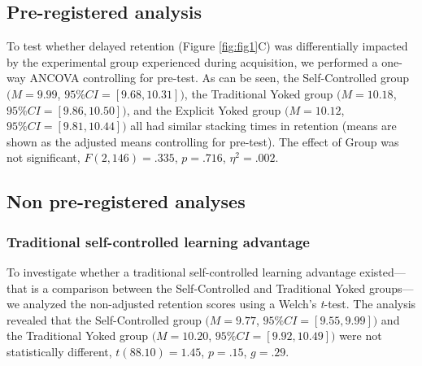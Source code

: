 \documentclass[
  english,
  doc, donotrepeattitle,floatsintext]{apa7}
\begin{document}
\hypertarget{pre-registered-analysis}{%
\subsection{Pre-registered analysis}\label{pre-registered-analysis}}

To test whether delayed retention (Figure \ref{fig:fig1}C) was differentially impacted by the experimental group experienced during acquisition, we performed a one-way ANCOVA controlling for pre-test. As can be seen, the Self-Controlled group \((M = 9.99\), \(95\%CI = [9.68,10.31])\), the Traditional Yoked group \((M = 10.18\), \(95\%CI = [9.86,10.50])\), and the Explicit Yoked group \((M = 10.12\), \(95\%CI = [9.81,10.44])\) all had similar stacking times in retention (means are shown as the adjusted means controlling for pre-test). The effect of Group was not significant, \(F(2,146) = .335\), \(p = .716\), \(\eta^2 = .002\).

\hypertarget{non-pre-registered-analyses}{%
\subsection{Non pre-registered analyses}\label{non-pre-registered-analyses}}

\hypertarget{traditional-self-controlled-learning-advantage}{%
\subsubsection{Traditional self-controlled learning advantage}\label{traditional-self-controlled-learning-advantage}}

To investigate whether a traditional self-controlled learning advantage existed---that is a comparison between the Self-Controlled and Traditional Yoked groups---we analyzed the non-adjusted retention scores using a Welch's \emph{t}-test. The analysis revealed that the Self-Controlled group \((M = 9.77\), \(95\%CI = [9.55,9.99])\) and the Traditional Yoked group \((M = 10.20\), \(95\%CI = [9.92,10.49])\) were not statistically different, \(t(88.10) = 1.45\), \(p = .15\), \(g = .29\).
\end{document}
